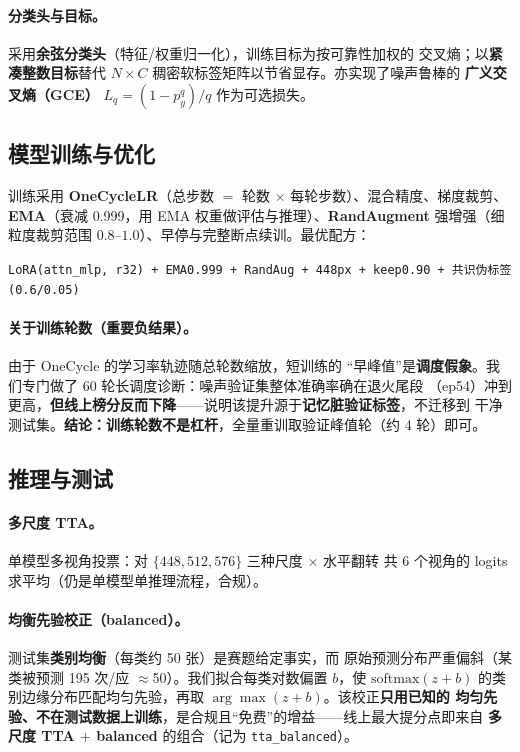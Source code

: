 \documentclass[11pt]{ctexart}
\newcommand{\kw}[1]{\textbf{#1}}
\begin{document}
\paragraph{分类头与目标。}采用\kw{余弦分类头}（特征/权重归一化），训练目标为按可靠性加权的
交叉熵；以\kw{紧凑整数目标}替代 $N\times C$ 稠密软标签矩阵以节省显存。亦实现了噪声鲁棒的
\kw{广义交叉熵（GCE）} $L_q=(1-p_y^q)/q$ 作为可选损失。

\subsection{模型训练与优化}
训练采用 \kw{OneCycleLR}（总步数 $=$ 轮数 $\times$ 每轮步数）、混合精度、梯度裁剪、
\kw{EMA}（衰减 0.999，用 EMA 权重做评估与推理）、\kw{RandAugment} 强增强（细粒度裁剪范围
$0.8$–$1.0$）、早停与完整断点续训。最优配方：
\begin{center}
\texttt{LoRA(attn\_mlp, r32) + EMA0.999 + RandAug + 448px + keep0.90 + 共识伪标签(0.6/0.05)}
\end{center}
\paragraph{关于训练轮数（重要负结果）。}由于 OneCycle 的学习率轨迹随总轮数缩放，短训练的
“早峰值”是\kw{调度假象}。我们专门做了 60 轮长调度诊断：噪声验证集整体准确率确在退火尾段
（ep54）冲到更高，\kw{但线上榜分反而下降}——说明该提升源于\kw{记忆脏验证标签}，不迁移到
干净测试集。\kw{结论：训练轮数不是杠杆}，全量重训取验证峰值轮（约 4 轮）即可。

\subsection{推理与测试}
\paragraph{多尺度 TTA。}单模型多视角投票：对 $\{448,512,576\}$ 三种尺度 $\times$ 水平翻转
共 6 个视角的 logits 求平均（仍是单模型单推理流程，合规）。

\paragraph{均衡先验校正（balanced）。}测试集\kw{类别均衡}（每类约 50 张）是赛题给定事实，而
原始预测分布严重偏斜（某类被预测 195 次/应 $\approx$50）。我们拟合每类对数偏置 $b$，使
$\mathrm{softmax}(z+b)$ 的类别边缘分布匹配均匀先验，再取 $\arg\max(z+b)$。该校正\kw{只用已知的
均匀先验、不在测试数据上训练}，是合规且“免费”的增益——线上最大提分点即来自
\kw{多尺度 TTA $+$ balanced} 的组合（记为 \texttt{tta\_balanced}）。
\end{document}
